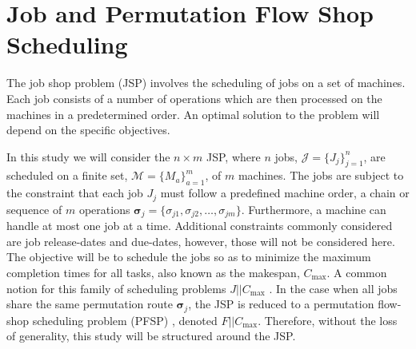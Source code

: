 \documentclass[smallextended]{svjour3}
\renewcommand{\vsigma}{\bm \sigma}
\begin{document}
	
	
	
	
	
	
	\section{Job and Permutation Flow Shop Scheduling}
	The job shop problem (JSP) involves the scheduling of jobs on a set of machines. Each job consists of a number of operations which are then processed on the machines in a predetermined order. An optimal solution to the problem will depend on the specific objectives. 
	
	In this study we will consider the $n\times m$ JSP,  where $n$ jobs, $\mathcal{J}=\{J_j\}_{j=1}^n$, are scheduled on a finite set, $\mathcal{M}=\{M_a\}_{a=1}^m$, of $m$ machines. The jobs are subject to the constraint that each job $J_j$ must follow a predefined machine order, a chain or sequence of $m$ operations $\vsigma_j=\{\sigma_{j1},\sigma_{j2},\dotsc,\sigma_{jm}\}$. Furthermore, a machine can handle at most one job at a time. Additional constraints commonly considered are job release-dates and due-dates, however, those will not be considered here. 
	The objective will be to schedule the jobs so as to minimize the maximum completion times for all tasks, also known as the makespan, $C_{\max}$. A common notion for this family of scheduling problems $J||C_{\max}$ \citep{Pinedo08}. 
	In the case when all jobs share the same permutation route $\vsigma_j$, the JSP is reduced to a permutation flow-shop scheduling problem (PFSP) \citep{Guinet1998,Tay08}, denoted $F||C_{\max}$. Therefore, without the loss of generality, this study will be structured around the JSP. 
	
\end{document}
